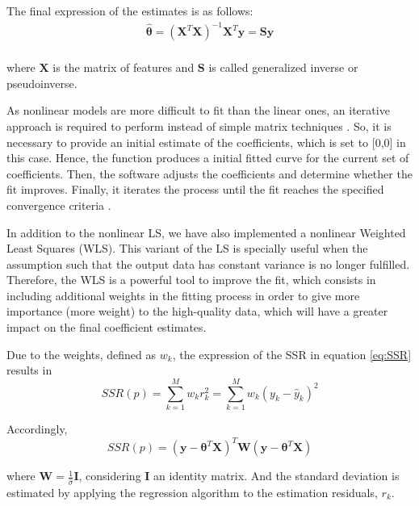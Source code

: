 \documentclass[a4paper, report, oneside, UKenglish]{memoir}
\newcommand{\bX}{\boldsymbol{X}}
\newcommand{\by}{\boldsymbol{y}}
\newcommand{\btheta}{\boldsymbol{\theta}}
\begin{document}
The final expression of the estimates is as follows:
\begin{equation}\label{eq:estimatorLS}
\begin{split}
    \hat{\btheta} = (\textbf{X}^{T}\textbf{X})^{-1}\textbf{X}^{T}\by = \textbf{S}\by\\
\end{split}
\end{equation}

where $\textbf{X}$ is the matrix of features and $\textbf{S}$ is called generalized inverse or pseudoinverse.

As nonlinear models are more difficult to fit than the linear ones, an iterative approach is required to perform instead of simple matrix techniques \cite{MathWorksRegression}. So, it is necessary to provide an initial estimate of the coefficients, which is set to [0,0] in this case. Hence, the function produces a initial fitted curve for the current set of coefficients. Then, the software adjusts the coefficients and determine whether the fit improves. Finally, it iterates the process until the fit reaches the specified convergence criteria \cite{MathWorksRegression}. 

In addition to the nonlinear LS, we have also implemented a nonlinear Weighted Least Squares (WLS). This variant of the LS is specially useful when the assumption such that the output data has constant variance is no longer fulfilled. Therefore, the WLS is a powerful tool to improve the fit, which consists in including additional weights in the fitting process in order to give more importance (more weight) to the high-quality data, which will have a greater impact on the final coefficient estimates. 

Due to the weights, defined as $w_{k}$, the expression of the SSR in equation \eqref{eq:SSR} results in
\begin{equation}\label{eq:SSR_2}
    SSR(p) = \sum\limits_{k=1}^{M}w_{k}{r}_{k}^{2} = \sum\limits_{k=1}^{M}w_{k}(y_k - \hat{y}_k)^2
\end{equation}

Accordingly, 
\begin{equation}
    SSR(p) = (\by - \btheta^T\bX)^T\textbf{W}(\by - \btheta^T\bX)
\end{equation} 

where $\textbf{W} = \frac{1}{\hat{\sigma}}\textbf{I}$, considering $\textbf{I}$ an identity matrix. And the standard deviation is estimated by applying the regression algorithm to the estimation residuals, $r_k$.
\end{document}

